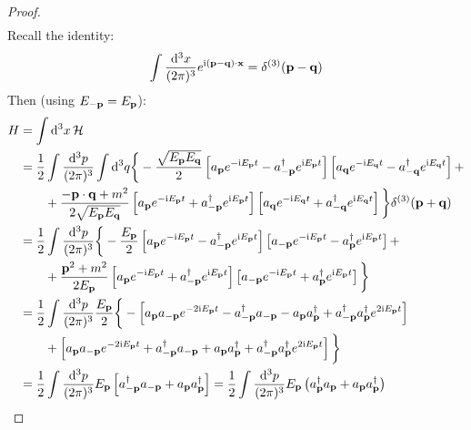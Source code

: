 \begin{proofbox}
\begin{proof}
\begin{equation*}
\begin{split}
      \end{split}
    \end{equation*}
    Recall the identity:
    \begin{equation}
      \int \frac{\mathrm{d}^3x}{(2\pi)^3} e^{\mathrm{i} (\mathbf{p} - \mathbf{q}) \cdot \mathbf{x}} = \delta^{(3)}(\mathbf{p} - \mathbf{q})
      \label{eq:fourier-delta}
    \end{equation}
    Then (using $ E_{-\mathbf{p}} = E_{\mathbf{p}} $):
    \begin{equation*}
      \begin{split}
        H
        &= \int \mathrm{d}^3x\, \mathcal{H} \\
        &= \frac{1}{2} \int \frac{\mathrm{d}^3 p}{(2\pi)^3} \int \mathrm{d}^3 q \bigg\{ - \frac{\sqrt{E_{\mathbf{p}} E_{\mathbf{q}}}}{2} \left[ a_{\mathbf{p}} e^{-\mathrm{i} E_{\mathbf{p}} t} - a_{-\mathbf{p}}^\dagger e^{\mathrm{i} E_{\mathbf{p}} t} \right] \left[ a_{\mathbf{q}} e^{-\mathrm{i} E_{\mathbf{q}} t} - a_{-\mathbf{q}}^\dagger e^{\mathrm{i} E_{\mathbf{q}} t} \right] + \\
        & \qquad + \frac{- \mathbf{p} \cdot \mathbf{q} + m^2}{2\sqrt{E_{\mathbf{p}} E_{\mathbf{q}}}} \left[ a_{\mathbf{p}} e^{-\mathrm{i} E_{\mathbf{p}} t} + a_{-\mathbf{p}}^\dagger e^{\mathrm{i} E_{\mathbf{p}} t} \right] \left[ a_{\mathbf{q}} e^{-\mathrm{i} E_{\mathbf{q}} t} + a_{-\mathbf{q}}^\dagger e^{\mathrm{i} E_{\mathbf{q}} t} \right] \bigg\} \delta^{(3)}(\mathbf{p} + \mathbf{q}) \\
        &= \frac{1}{2} \int \frac{\mathrm{d}^3 p}{(2\pi)^3} \bigg\{ - \frac{E_{\mathbf{p}}}{2} \left[ a_{\mathbf{p}} e^{-\mathrm{i} E_{\mathbf{p}} t} - a_{-\mathbf{p}}^\dagger e^{\mathrm{i} E_{\mathbf{p}} t} \right] \left[ a_{-\mathbf{p}} e^{-\mathrm{i} E_{\mathbf{p}} t} - a_{\mathbf{p}}^\dagger e^{\mathrm{i} E_{\mathbf{p}} t} \right] + \\
        & \qquad + \frac{\mathbf{p}^2 + m^2}{2E_{\mathbf{p}}} \left[ a_{\mathbf{p}} e^{-\mathrm{i} E_{\mathbf{p}} t} + a_{-\mathbf{p}}^\dagger e^{\mathrm{i} E_{\mathbf{p}} t} \right] \left[ a_{-\mathbf{p}} e^{-\mathrm{i} E_{\mathbf{p}} t} + a_{\mathbf{p}}^\dagger e^{\mathrm{i} E_{\mathbf{p}} t} \right] \bigg\} \\
        &= \frac{1}{2} \int \frac{\mathrm{d}^3p}{(2\pi)^3} \frac{E_{\mathbf{p}}}{2} \bigg\{ - \left[ a_{\mathbf{p}} a_{-\mathbf{p}} e^{-2\mathrm{i} E_{\mathbf{p}} t} - a_{-\mathbf{p}}^\dagger a_{-\mathbf{p}} - a_{\mathbf{p}} a_{\mathbf{p}}^\dagger + a_{-\mathbf{p}}^\dagger a_{\mathbf{p}}^\dagger e^{2\mathrm{i} E_{\mathbf{p}} t} \right] \\
        & \qquad + \left[ a_{\mathbf{p}} a_{-\mathbf{p}} e^{-2\mathrm{i} E_{\mathbf{p}} t} + a_{-\mathbf{p}}^\dagger a_{-\mathbf{p}} + a_{\mathbf{p}} a_{\mathbf{p}}^\dagger + a_{-\mathbf{p}}^\dagger a_{\mathbf{p}}^\dagger e^{2\mathrm{i} E_{\mathbf{p}} t} \right] \bigg\} \\
        &= \frac{1}{2} \int \frac{\mathrm{d}^3p}{(2\pi)^3} E_{\mathbf{p}} \left[ a_{-\mathbf{p}}^\dagger a_{-\mathbf{p}} + a_{\mathbf{p}} a_{\mathbf{p}}^\dagger \right] = \frac{1}{2} \int \frac{\mathrm{d}^3p}{(2\pi)^3} E_{\mathbf{p}} \left( a_{\mathbf{p}}^\dagger a_{\mathbf{p}} + a_{\mathbf{p}} a_{\mathbf{p}}^\dagger \right)
      \end{split}
    \end{equation*}
  \end{proof}
\end{proofbox}

